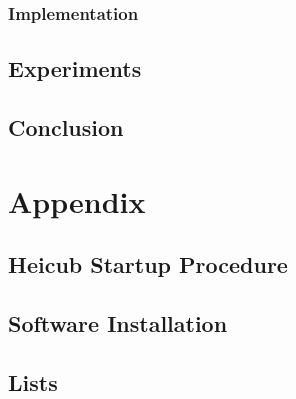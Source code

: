 \documentclass  [
  paper    = a4,
  BCOR     = 10mm,
  twoside,
  fontsize = 12pt,
  toc      = bibnumbered,
  toc      = listofnumbered,
  numbers  = noendperiod,
  headings = normal,
  listof   = leveldown,
  version  = 3.03
]                                       {scrreprt}
\begin{document}
  \section{Implementation}  
   
  \chapter{Experiments}
  
  
  

  \chapter{Conclusion}

  \part{Appendix}
  \begin{appendix}
    \chapter{Heicub Startup Procedure}
    \chapter{Software Installation}
    \chapter{Lists}
    \listoffigures
    \listoftables
    
    
    
  \end{appendix}
\end{document}
